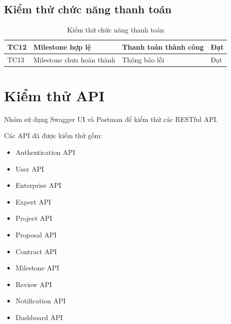 \subsection{Kiểm thử chức năng thanh toán}

\begin{table}[H]

\centering

\caption{Kiểm thử chức năng thanh toán}

\begin{tabular}{|p{2cm}|p{4cm}|p{4cm}|p{4cm}|}

\hline

TC12
&
Milestone hợp lệ
&
Thanh toán thành công
&
Đạt
\\
\hline

TC13
&
Milestone chưa hoàn thành
&
Thông báo lỗi
&
Đạt
\\
\hline

\end{tabular}

\end{table}


\section{Kiểm thử API}

Nhóm sử dụng Swagger UI và Postman để kiểm thử các RESTful API.

Các API đã được kiểm thử gồm:

\begin{itemize}

\item Authentication API

\item User API

\item Enterprise API

\item Expert API

\item Project API

\item Proposal API

\item Contract API

\item Milestone API

\item Review API

\item Notification API

\item Dashboard API

\end{itemize}

